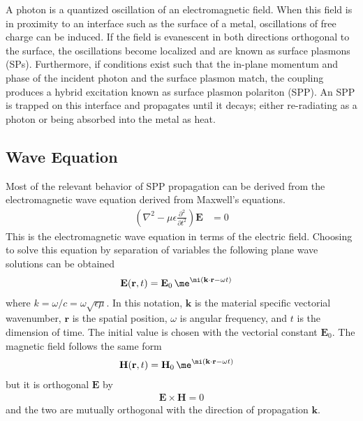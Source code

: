 A photon is a quantized oscillation of an electromagnetic field.  When this
field is in proximity to an interface such as the surface of a metal,
oscillations of free charge can be induced.  If the field is evanescent in
both directions orthogonal to the surface, the oscillations become
localized and are known as surface plasmons (SPs).  Furthermore, if
conditions exist such that the in-plane momentum and phase of the incident
photon and the surface plasmon match, the coupling produces a hybrid
excitation known as surface plasmon polariton (SPP).  An SPP is trapped on
this interface and propagates until it decays; either re-radiating as a
photon or being absorbed into the metal as heat.

\subsection{Wave Equation}
Most of the relevant behavior of SPP propagation can be derived from the
electromagnetic wave equation derived from Maxwell's equations.
\begin{align}
\left(\nabla^2-\mu\epsilon\frac{\partial^2}{\partial t^2}\right)\mathbf{E}&=0
\label{eqn:ewe}
\end{align}
This is the electromagnetic wave equation in terms of the electric field.
Choosing to solve this equation by separation of variables the following
plane wave solutions can be obtained
\begin{align}
 \mathbf{E} ( \mathbf{r}, t ) &= \mathbf{E}_0\, \me^{\mi (\mathbf{k} \cdot \mathbf{r} - \omega t )}
\label{eqn:planewaves}
\end{align}
where $k=\omega/c=\omega\sqrt{\epsilon\mu}$.  In this notation,
$\mathbf{k}$ is the material specific vectorial wavenumber, $\mathbf{r}$ is the
spatial position, $\omega$ is angular frequency, and $t$ is
the dimension of time.
The initial value is chosen with the vectorial constant $\mathbf{E}_0$.
The magnetic field follows the same form
\begin{align}
 \mathbf{H} ( \mathbf{r}, t ) &= \mathbf{H}_0\, \me^{\mi (\mathbf{k}
 \cdot \mathbf{r} - \omega t )}
\end{align} 
but it is orthogonal $\mathbf{E}$ by
\begin{align}
\mathbf{E} \times \mathbf{H} = 0
\end{align}
and the two are mutually orthogonal with the direction of propagation
$\mathbf{k}$.

